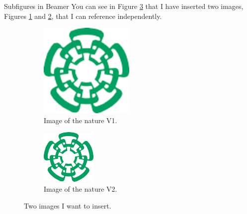\documentclass[
	11pt, %
]{beamer}
\begin{document}
\begin{frame}{Subfigures in Beamer}
  You can see in Figure \ref{fig:images} that I have inserted two images, Figures \ref{fig:nature1} and \ref{fig:nature2}, that I can reference independently.
  \begin{figure}
    \centering
    \begin{subfigure}[t]{0.4\textwidth}
      \includegraphics[width=0.5\textwidth]{cinvestavlogo}
      \caption{Image of the nature V1.}
      \label{fig:nature1}
    \end{subfigure}
    \begin{subfigure}[b]{0.4\textwidth}
      \includegraphics[width=\textwidth]{cinvestavlogo}
      \caption{Image of the nature V2.}
      \label{fig:nature2}
    \end{subfigure}
    \caption{Two images I want to insert.}
    \label{fig:images}
  \end{figure}
  \end{frame}
\end{document}

